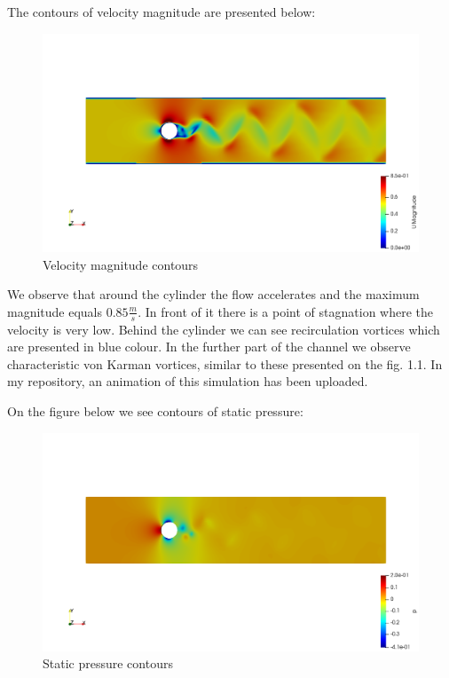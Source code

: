 \documentclass[a4paper,11pt]{article}
\begin{document}
The contours of velocity magnitude are presented below: 

\begin{figure}[h]
\centering
\includegraphics[width=14cm]{velocity.PNG}
\caption{Velocity magnitude contours}
\end{figure}

We observe that around the cylinder the flow accelerates and the maximum magnitude equals $0.85\frac{m}{s}$. In front of it there is a point of stagnation where the velocity is very low. Behind the cylinder we can see recirculation vortices which are presented in blue colour. In the further part of the channel we observe characteristic von Karman vortices, similar to these presented on the fig. 1.1. In my repository, an animation of this simulation has been uploaded.

\newpage

On the figure below we see contours of static pressure:

\begin{figure}[h]
\centering
\includegraphics[width=14cm]{pressure.PNG}
\caption{Static pressure contours}
\end{figure}
\end{document}
